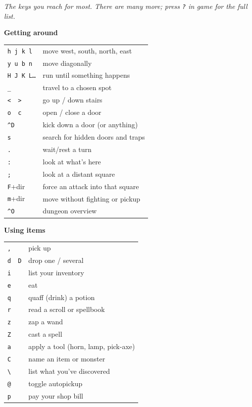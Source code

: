 \documentclass[openany,10pt]{book}
\begin{document}
\thispagestyle{empty}
{\par\vspace{0.2em}
{\itshape The keys you reach for most. There are many more; press \texttt{?} in game for the full list.}\par}
\vspace{1.2em}
\footnotesize
\noindent
\begin{minipage}[t]{0.48\textwidth}
\textbf{Getting around}\par\vspace{0.2em}
\begin{tabular}{@{}ll@{}}
\texttt{h j k l} & move west, south, north, east\\
\texttt{y u b n} & move diagonally\\
\texttt{H J K L\ldots} & run until something happens\\
\texttt{\_} & travel to a chosen spot\\
\texttt{<}\ \ \texttt{>} & go up / down stairs\\
\texttt{o}\ \ \texttt{c} & open / close a door\\
\texttt{\^{}D} & kick down a door (or anything)\\
\texttt{s} & search for hidden doors and traps\\
\texttt{.} & wait/rest a turn\\
\texttt{:} & look at what's here\\
\texttt{;} & look at a distant square\\
\texttt{F}+dir & force an attack into that square\\
\texttt{m}+dir & move without fighting or pickup\\
\texttt{\^{}O} & dungeon overview\\
\end{tabular}

\vspace{0.9em}
\textbf{Using items}\par\vspace{0.2em}
\begin{tabular}{@{}ll@{}}
\texttt{,} & pick up\\
\texttt{d}\ \ \texttt{D} & drop one / several\\
\texttt{i} & list your inventory\\
\texttt{e} & eat\\
\texttt{q} & quaff (drink) a potion\\
\texttt{r} & read a scroll or spellbook\\
\texttt{z} & zap a wand\\
\texttt{Z} & cast a spell\\
\texttt{a} & apply a tool (horn, lamp, pick-axe)\\
\texttt{C} & name an item or monster\\
\texttt{\textbackslash} & list what you've discovered\\
\texttt{@} & toggle autopickup\\
\texttt{p} & pay your shop bill\\
\end{tabular}
\end{minipage}
\end{document}
